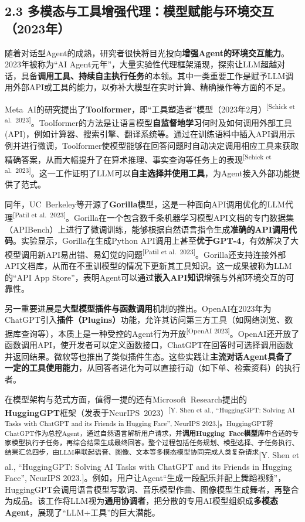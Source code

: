\documentclass[
  letterpaper,
]{scrbook}
\begin{document}
\subsection{2.3
多模态与工具增强代理：模型赋能与环境交互（2023年）}\label{ux591aux6a21ux6001ux4e0eux5de5ux5177ux589eux5f3aux4ee3ux7406ux6a21ux578bux8d4bux80fdux4e0eux73afux5883ux4ea4ux4e922023ux5e74}

随着对话型Agent的成熟，研究者很快将目光投向\textbf{增强Agent的环境交互能力}。2023年被称为``AI
Agent元年''，大量实验性代理框架涌现，探索让LLM超越对话，具备\textbf{调用工具、持续自主执行任务}的本领。其中一类重要工作是赋予LLM调用外部API或工具的能力，以弥补大模型在实时计算、精确操作等方面的不足。

Meta~AI的研究提出了\textbf{Toolformer}，即``工具塑造者''模型（2023年2月）\textsuperscript{{[}Schick
et
al.~2023{]}}。Toolformer的方法是让语言模型\textbf{自监督地学习}何时及如何调用外部工具(API)，例如计算器、搜索引擎、翻译系统等。通过在训练语料中插入API调用示例并进行微调，Toolformer使模型能够在回答问题时自动决定调用相应工具来获取精确答案，从而大幅提升了在算术推理、事实查询等任务上的表现\textsuperscript{{[}Schick
et
al.~2023{]}}。这一工作证明了LLM可以\textbf{自主选择并使用工具}，为Agent接入外部功能提供了范式。

同年，UC~Berkeley等开源了\textbf{Gorilla}模型，这是一种面向API调用优化的LLM代理\textsuperscript{{[}Patil
et
al.~2023{]}}。Gorilla在一个包含数千条机器学习模型API文档的专门数据集（APIBench）上进行了微调训练，能够根据自然语言指令生成\textbf{准确的API调用代码}。实验显示，Gorilla在生成Python
API调用上甚至\textbf{优于GPT-4}，有效解决了大模型调用新API易出错、易幻觉的问题\textsuperscript{{[}Patil
et
al.~2023{]}}。Gorilla还支持连接外部API文档库，从而在不重训模型的情况下更新其工具知识。这一成果被称为LLM的``API
App
Store''，表明Agent可以通过\textbf{嵌入API知识}增强与外部环境交互的可靠性。

另一重要进展是\textbf{大型模型插件与函数调用}机制的推出。OpenAI在2023年为ChatGPT引入\textbf{插件（Plugins）}功能，允许其访问第三方工具（如网络浏览、数据库查询等），本质上是一种受控的Agent行为开放\textsuperscript{{[}OpenAI
2023{]}}。OpenAI还开放了函数调用API，使开发者可以定义函数接口，ChatGPT在回答时可选择调用函数并返回结果。微软等也推出了类似插件生态。这些实践让\textbf{主流对话Agent具备了一定的工具使用能力}，从回答者进化为可以直接行动（如下单、检索资料）的执行者。

在模型架构与范式方面，值得一提的还有Microsoft~Research提出的\textbf{HuggingGPT}框架（发表于NeurIPS~2023）\textsuperscript{{[}Y.
Shen et al., ``HuggingGPT: Solving AI Tasks with ChatGPT and its Friends
in Hugging Face'', NeurIPS
2023.{]}。HuggingGPT将ChatGPT作为总控Agent，通过自然语言解析用户请求，并\textbf{调用Hugging~Face模型库}中合适的专家模型执行子任务，再综合结果生成最终回答。整个过程包括任务规划、模型选择、子任务执行、结果汇总四步，由LLM串联起语音、图像、文本等多模态模型协同完成人类复杂请求}{[}Y.
Shen et al., ``HuggingGPT: Solving AI Tasks with ChatGPT and its Friends
in Hugging Face'', NeurIPS
2023.{]}。例如，用户让Agent``生成一段配乐并配上舞蹈视频''，HuggingGPT会调用语言模型写歌词、音乐模型作曲、图像模型生成舞者，再整合为成品。该工作将LLM视为\textbf{通用协调者}，把分散的专用AI模型组织成\textbf{多模态Agent}，展现了``LLM+工具''的巨大潜能。
\end{document}

